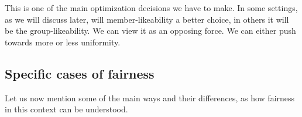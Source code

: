 This is one of the main optimization decisions we have to make. In some settings, as we will discuss later, will member-likeability a better choice, in others it will be the group-likeability. We can view it as an opposing force. We can either push towards more or less uniformity.


\subsection{Specific cases of fairness}
Let us now mention some of the main ways and their differences, as how fairness in this context can be understood.

